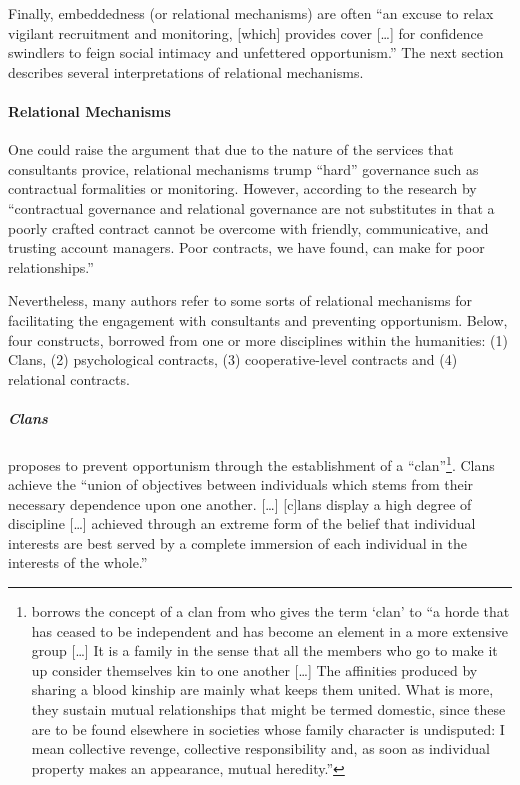\documentclass[12pt]{article}
\begin{document}
Finally, \citet[276]{shapiro2005} embeddedness (or relational
mechanisms) are often ``an excuse to relax vigilant recruitment and
monitoring, {[}which{]} provides cover {[}\ldots{]} for confidence
swindlers to feign social intimacy and unfettered opportunism.'' The
next section describes several interpretations of relational mechanisms.

\paragraph{Relational Mechanisms}\label{relational-mechanisms}

One could raise the argument that due to the nature of the services that
consultants provice, relational mechanisms trump ``hard'' governance
such as contractual formalities or monitoring. However, according to the
research by \citet[4-5]{lacity2012} ``contractual governance and
relational governance are not substitutes in that a poorly crafted
contract cannot be overcome with friendly, communicative, and trusting
account managers. Poor contracts, we have found, can make for poor
relationships.''

Nevertheless, many authors refer to some sorts of relational mechanisms
for facilitating the engagement with consultants and preventing
opportunism. Below, four constructs, borrowed from one or more
disciplines within the humanities: (1) Clans, (2) psychological
contracts, (3) cooperative-level contracts and (4) relational contracts.

\subparagraph{Clans}\label{clans}

\citet{ouchi1980} proposes to prevent opportunism through the
establishment of a ``clan''\footnote{\citet{ouchi1980} borrows the
  concept of a clan from \citet[127]{durkheim1997} who gives the term
  `clan' to ``a horde that has ceased to be independent and has become
  an element in a more extensive group {[}\ldots{]} It is a family in
  the sense that all the members who go to make it up consider
  themselves kin to one another {[}\ldots{]} The affinities produced by
  sharing a blood kinship are mainly what keeps them united. What is
  more, they sustain mutual relationships that might be termed domestic,
  since these are to be found elsewhere in societies whose family
  character is undisputed: I mean collective revenge, collective
  responsibility and, as soon as individual property makes an
  appearance, mutual heredity.''}. Clans achieve the ``union of
objectives between individuals which stems from their necessary
dependence upon one another. {[}\ldots{]} {[}c{]}lans display a high
degree of discipline {[}\ldots{]} achieved through an extreme form of
the belief that individual interests are best served by a complete
immersion of each individual in the interests of the whole.''
\end{document}
